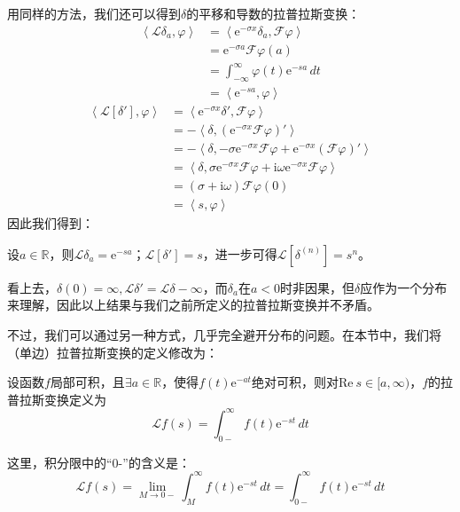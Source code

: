 用同样的方法，我们还可以得到$\delta$的平移和导数的拉普拉斯变换：
\begin{align*}
    \left\langle \mathcal{L}\delta_a,\varphi\right\rangle&=\left\langle \mathrm{e}^{-\sigma x}\delta_a,\mathcal{F} \varphi\right\rangle\\
    &=\mathrm{e}^{-\sigma a}\mathcal{F}\varphi(a)\\
    &=\int_{-\infty}^{\infty}\varphi(t)\mathrm{e}^{-s a}\,dt\\
    &=\left\langle \mathrm{e}^{-s a},\varphi\right\rangle
\end{align*}
\begin{align*}
    \left\langle \mathcal{L}\left[\delta'\right],\varphi\right\rangle&=\left\langle \mathrm{e}^{-\sigma x}\delta',\mathcal{F} \varphi\right\rangle\\
    &=-\left\langle \delta,\left(\mathrm{e}^{-\sigma x}\mathcal{F} \varphi\right)'\right\rangle\\
    &=-\left\langle \delta,-\sigma \mathrm{e}^{-\sigma x}\mathcal{F} \varphi + \mathrm{e}^{-\sigma x}(\mathcal{F} \varphi)'\right\rangle\\
    &=\left\langle \delta,\sigma \mathrm{e}^{-\sigma x}\mathcal{F} \varphi + \mathrm{i}\omega \mathrm{e}^{-\sigma x}\mathcal{F} \varphi\right\rangle\\
    &=(\sigma + \mathrm{i}\omega)\mathcal{F} \varphi(0)\\
    &=\left\langle s,\varphi\right\rangle
\end{align*}
因此我们得到：
\begin{proposition}
    设$a\in\mathbb{R}$，则$\mathcal{L} \delta_a=\mathrm{e}^{-s a}$；$\mathcal{L} \left[\delta'\right]=s$，进一步可得$\mathcal{L} \left[\delta^{(n)}\right]=s^n$。
\end{proposition}

看上去，$\delta(0)=\infty,\mathcal{L} \delta'=\mathcal{L} \delta-\infty$，而$\delta_a$在$a<0$时非因果，但$\delta$应作为一个分布来理解，因此以上结果与我们之前所定义的拉普拉斯变换并不矛盾。

不过，我们可以通过另一种方式，几乎完全避开分布的问题。在本节中，我们将（单边）拉普拉斯变换的定义修改为：
\begin{definition}
    设函数$f$局部可积，且$\exists a\in\mathbb{R}$，使得$f(t)\mathrm{e}^{-at}$绝对可积，则对$\text{Re}\ s\in[a,\infty)$，$f$的拉普拉斯变换定义为
    \[\mathcal{L} f(s)=\int_{0-}^{\infty}f(t)\mathrm{e}^{-st}\,dt\]
\end{definition}
这里，积分限中的“0-”的含义是：
\[\mathcal{L} f(s)=\lim_{M\to 0-}\int_{M}^{\infty}f(t)\mathrm{e}^{-st}\,dt=\int_{0-}^{\infty}f(t)\mathrm{e}^{-st}\,dt\]

